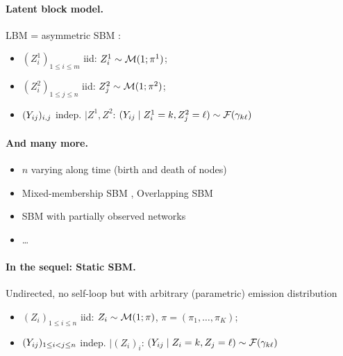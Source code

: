 
\jump \paragraph{Latent block model.} LBM = asymmetric SBM \citep{GoN05}:
\begin{itemize}
\item $(Z^1_i)_{1 \leq i \leq m}$ iid: $Z^1_i \sim \mathcal{M}(1; \pi^1)$;
\item $(Z^2_i)_{1 \leq j \leq n}$ iid: $Z^2_j \sim \mathcal{M}(1; \pi^2)$;
\item $({Y_{ij}})_{i, j}$ indep. $\mid Z^1, Z^2$: 
$({Y_{ij}} \mid Z^1_i=k, Z^2_j=\ell) \sim \mathcal{F}(\gamma_{k\ell})$
\end{itemize}

\jump \paragraph{And many more.} 
\begin{itemize}
 \item $n$ varying along time (birth and death of nodes)
 \item Mixed-membership SBM \citep{ABF08}, Overlapping SBM \citep{LBA11}
 \item SBM with partially observed networks \citep{TBC17}
 \item \dots
\end{itemize}


\jump \paragraph{In the sequel: Static SBM.} Undirected, no self-loop but with arbitrary (parametric) emission distribution
\begin{itemize}
\item $(Z_i)_{1 \leq i \leq n}$ iid: 
$Z_i \sim \mathcal{M}(1; \pi)$, $\pi = (\pi_1, \dots, \pi_K)$;
\item $({Y_{ij}})_{1 \leq i < j \leq n}$ indep. $\mid (Z_i)_i$: 
$({Y_{ij}} \mid Z_i=k, Z_j=\ell) \sim \mathcal{F}(\gamma_{k\ell})$
\end{itemize}

